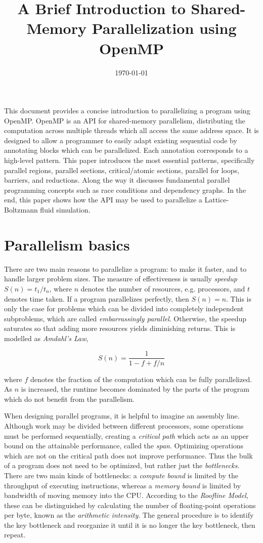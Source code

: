 \documentclass[conference, a4paper]{IEEEtran-modified}
\title{A Brief Introduction to Shared-Memory Parallelization using OpenMP}
\author{
\authorblockN{Nathan W Brei}
\authorblockA{\texttt{brei@in.tum.de}} 
}
\date\today
\begin{document}
\maketitle

This document provides a concise introduction to parallelizing a program using OpenMP. OpenMP is an API for shared-memory parallelism, distributing the computation across multiple threads which all access the same address space. It is designed to allow a programmer to easily adapt existing sequential code by annotating blocks which can be parallelized. Each annotation corresponds to a high-level pattern. This paper introduces the most essential patterns, specifically parallel regions, parallel sections, critical/atomic sections, parallel for loops, barriers, and reductions. Along the way it discusses fundamental parallel programming concepts such as race conditions and dependency graphs. In the end, this paper shows how the API may be used to parallelize a Lattice-Boltzmann fluid simulation.

\section{Parallelism basics}

There are two main reasons to parallelize a program: to make it faster, and to handle larger problem sizes. The measure of effectiveness is usually \emph{speedup} $ S(n) = t_1 / t_n$, where $n$ denotes the number of resources, e.g. processors, and $t$ denotes time taken. If a program parallelizes perfectly, then $S(n) = n$. This is only the case for problems which can be divided into completely independent subproblems, which are called \emph{embarrassingly parallel}. Otherwise, the speedup saturates so that adding more resources yields diminishing returns. This is modelled as \emph{Amdahl's Law}, 

\[
S(n) = \frac{1}{1-f+f/n}
\]

where $f$ denotes the fraction of the computation which can be fully parallelized. As $n$ is increased, the runtime becomes dominated by the parts of the program which do not benefit from the parallelism.

When designing parallel programs, it is helpful to imagine an assembly line. Although work may be divided between different processors, some operations must be performed sequentially, creating a \emph{critical path} which acts as an upper bound on the attainable performance, called the \emph{span}. Optimizing operations which are not on the critical path does not improve performance. Thus the bulk of a program does not need to be optimized, but rather just the \emph{bottlenecks}. There are two main kinds of bottlenecks: a \emph{compute bound} is limited by the throughput of executing instructions, whereas a \emph{memory bound} is limited by bandwidth of moving memory into the CPU. According to the \emph{Roofline Model}, these can be distinguished by calculating the number of floating-point operations per byte, known as the \emph{arithmetic intensity}. The general procedure is to identify the key bottleneck and reorganize it until it is no longer the key bottleneck, then repeat.
\end{document}
